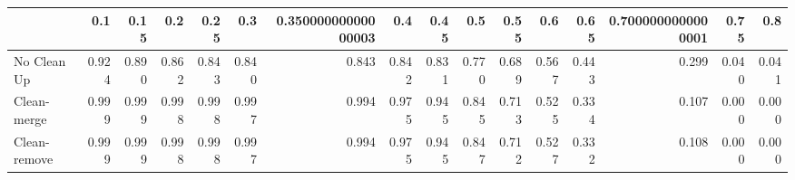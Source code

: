 \begin{tabular}{lrrrrrrrrrrrrrrr}
\toprule
{} &   0.1 &  0.15 &   0.2 &  0.25 &   0.3 & 0.35000000000000003 &   0.4 &  0.45 &   0.5 &  0.55 &   0.6 &  0.65 & 0.7000000000000001 &  0.75 &   0.8 \\
\midrule
No Clean Up  & 0.924 & 0.890 & 0.862 & 0.843 & 0.840 &               0.843 & 0.842 & 0.831 & 0.770 & 0.689 & 0.567 & 0.443 &              0.299 & 0.040 & 0.041 \\
Clean-merge  & 0.999 & 0.999 & 0.998 & 0.998 & 0.997 &               0.994 & 0.975 & 0.945 & 0.845 & 0.713 & 0.525 & 0.334 &              0.107 & 0.000 & 0.000 \\
Clean-remove & 0.999 & 0.999 & 0.998 & 0.998 & 0.997 &               0.994 & 0.975 & 0.945 & 0.847 & 0.712 & 0.527 & 0.332 &              0.108 & 0.000 & 0.000 \\
\bottomrule
\end{tabular}
